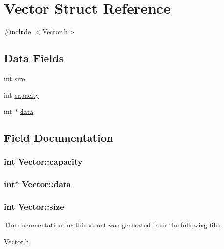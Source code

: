 \hypertarget{structVector}{\section{Vector Struct Reference}
\label{structVector}
}


{\ttfamily \#include $<$Vector.\-h$>$}

\subsection*{Data Fields}
\begin{DoxyCompactItemize}
\item 
int \hyperlink{structVector_ae13c6e730a6558ba444beb8f7e44d4ca}{size}
\item 
int \hyperlink{structVector_a6d49b240ab4a8ccb9b1c7297e78511da}{capacity}
\item 
int $\ast$ \hyperlink{structVector_a67bbdb285c3d50f63e79c214cf0735a8}{data}
\end{DoxyCompactItemize}


\subsection{Field Documentation}
\hypertarget{structVector_a6d49b240ab4a8ccb9b1c7297e78511da}{
\subsubsection[{capacity}]{\setlength{\rightskip}{0pt plus 5cm}int Vector\-::capacity}}\label{structVector_a6d49b240ab4a8ccb9b1c7297e78511da}
\hypertarget{structVector_a67bbdb285c3d50f63e79c214cf0735a8}{
\subsubsection[{data}]{\setlength{\rightskip}{0pt plus 5cm}int$\ast$ Vector\-::data}}\label{structVector_a67bbdb285c3d50f63e79c214cf0735a8}
\hypertarget{structVector_ae13c6e730a6558ba444beb8f7e44d4ca}{
\subsubsection[{size}]{\setlength{\rightskip}{0pt plus 5cm}int Vector\-::size}}\label{structVector_ae13c6e730a6558ba444beb8f7e44d4ca}


The documentation for this struct was generated from the following file\-:\begin{DoxyCompactItemize}
\item 
\hyperlink{Vector_8h}{Vector.\-h}\end{DoxyCompactItemize}
